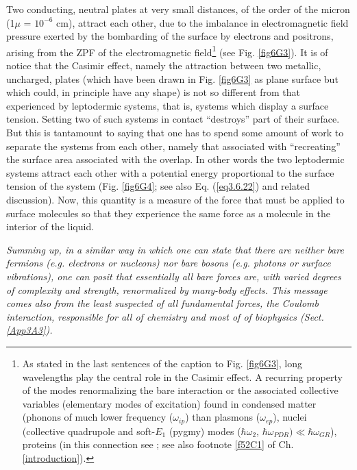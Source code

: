 \begin{subappendices}
Two conducting,
neutral plates at very small distances, of the order of the micron (1$\mu$ = $10^{-6}$ cm), attract each
other, due to the imbalance in electromagnetic field pressure exerted by the bombarding
of the surface by electrons and positrons, arising from the ZPF of the electromagnetic field\footnote{As stated in the last sentences of the caption to Fig. \ref{fig6G3}, long wavelengths play the central role in the Casimir effect. A recurring property of the modes renormalizing the bare interaction or the associated collective variables (elementary modes of excitation) found in condensed matter (phonons of much lower frequency ($\omega_{ip}$) than plasmons ($\omega_{ep}$), nuclei (collective quadrupole and soft-$E_1$ (pygmy) modes ($\hbar\omega_2$, $\hbar\omega_{PDR})\ll\hbar\omega_{GR}$), proteins (in this connection see \cite{Micheletti:04,Micheletti:01,Micheletti:02,Hamacher:10}; see also footnote \ref{f52C1} of Ch. \ref{introduction}).}
(see Fig. \ref{fig6G3}). It is of notice that the Casimir effect, namely the attraction between two metallic,
uncharged, plates (which have been drawn in Fig. \ref{fig6G3} as plane surface but which could, in
principle have any shape) is not so different from that experienced by leptodermic systems, that is, systems which display a surface tension. Setting two of such systems in contact
``destroys'' part of their surface.  But this is
tantamount to saying that one has to spend some amount of work to separate the systems from each other, namely that
associated with ``recreating'' the surface area associated with the overlap. In other words
the two leptodermic systems attract each other with a potential energy proportional to the
surface tension of the system (Fig. \ref{fig6G4}; see also Eq. (\ref{eq3.6.22}) and related discussion). Now, this quantity is a measure of the force that
must be applied to surface molecules so that they experience the same force as a molecule
in the interior of the liquid.


\emph{Summing up, in a similar way in which one can state that there are neither bare fermions (e.g. electrons or nucleons) nor bare bosons (e.g. photons or surface vibrations),  one can posit that essentially all  bare
forces are, with varied degrees of complexity and strength, renormalized 
by many-body effects. This message comes also from  the least suspected of all fundamental forces, the Coulomb interaction, responsible for all of chemistry and most of of biophysics (Sect. \ref{App3A3}).}

\end{subappendices}

